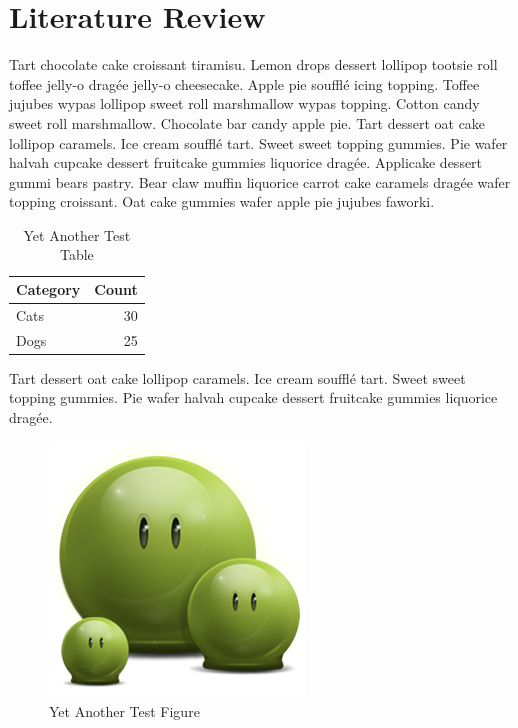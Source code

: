 \chapter{Literature Review}

Tart chocolate cake croissant tiramisu. Lemon drops dessert lollipop tootsie roll toffee jelly-o dragée jelly-o cheesecake. Apple pie soufflé icing topping. Toffee jujubes wypas lollipop sweet roll marshmallow wypas topping. Cotton candy sweet roll marshmallow. Chocolate bar candy apple pie. Tart dessert oat cake lollipop caramels. Ice cream soufflé tart. Sweet sweet topping gummies. Pie wafer halvah cupcake dessert fruitcake gummies liquorice dragée. Applicake dessert gummi bears pastry. Bear claw muffin liquorice carrot cake caramels dragée wafer topping croissant. Oat cake gummies wafer apple pie jujubes faworki. 

\begin{table}[hbt!]
   \centering
   \caption{Yet Another Test Table}
   \label{tab:dummy:3}
   \begin{tabular}{l r}
      \hline
      Category & Count\\
      \hline
      Cats & 30\\
      Dogs & 25\\
      \hline
   \end{tabular}
\end{table}

Tart dessert oat cake lollipop caramels. Ice cream soufflé tart. Sweet sweet topping gummies. Pie wafer halvah cupcake dessert fruitcake gummies liquorice dragée.

\begin{figure}[hbt!]\centering
   \includegraphics[width=.3\textwidth]{green} 
   \caption{Yet Another Test Figure}
   \label{fig:dummy:3}
\end{figure}
